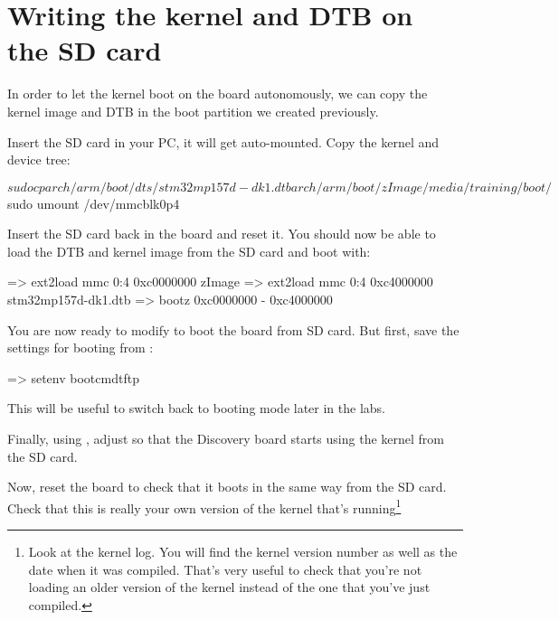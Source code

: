 \section{Writing the kernel and DTB on the SD card}

In order to let the kernel boot on the board autonomously, we can
copy the kernel image and DTB in the boot partition we created
previously.

Insert the SD card in your PC, it will get auto-mounted. Copy the
kernel and device tree:

\begin{bashinput}
$ sudo cp arch/arm/boot/dts/stm32mp157d-dk1.dtb arch/arm/boot/zImage /media/training/boot/
$ sudo umount /dev/mmcblk0p4
\end{bashinput}
\normalsize

Insert the SD card back in the board and reset it. You should now be
able to load the DTB and kernel image from the SD card and boot with:

\begin{ubootinput}
=> ext2load mmc 0:4 0xc0000000 zImage
=> ext2load mmc 0:4 0xc4000000 stm32mp157d-dk1.dtb
=> bootz 0xc0000000 - 0xc4000000
\end{ubootinput}

You are now ready to modify  to boot the board
from SD card. But first, save the settings for booting from
:

\begin{ubootinput}
=> setenv bootcmdtftp %
\end{ubootinput}

This will be useful to switch back to  booting mode
later in the labs.

Finally, using , adjust  so that
the Discovery board starts using the kernel from the SD card.

Now, reset the board to check that it boots in the same way from the
SD card. Check that this is really your own version of the kernel
that's running\footnote{Look at the kernel log. You will find the
kernel version number as well as the date when it was compiled.
That's very useful to check that you're not loading an older version
of the kernel instead of the one that you've just compiled.}

